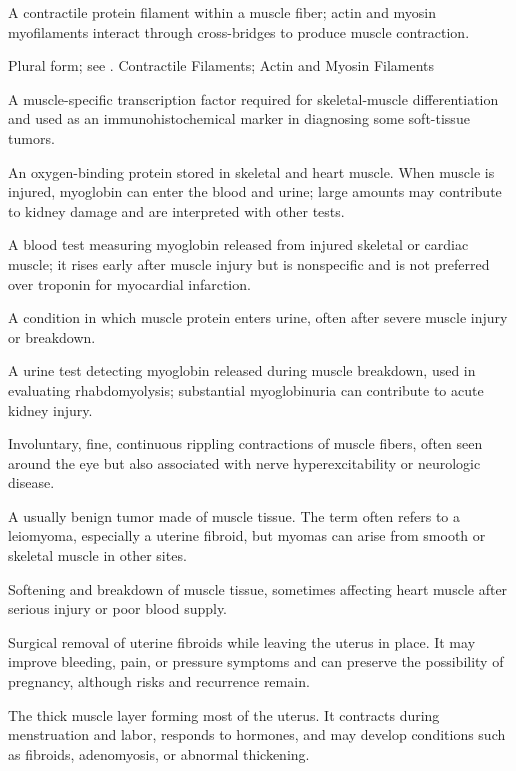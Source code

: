  A contractile protein filament within a muscle fiber; actin and myosin myofilaments interact through cross-bridges to produce muscle contraction.

 Plural form; see .
\synonyms
Contractile Filaments; Actin and Myosin Filaments

 A muscle-specific transcription factor required for skeletal-muscle differentiation and used as an immunohistochemical marker in diagnosing some soft-tissue tumors.

 An oxygen-binding protein stored in skeletal and heart muscle. When muscle is injured, myoglobin can enter the blood and urine; large amounts may contribute to kidney damage and are interpreted with other tests.

 A blood test measuring myoglobin released from injured skeletal or cardiac muscle; it rises early after muscle injury but is nonspecific and is not preferred over troponin for myocardial infarction.

 A condition in which muscle protein enters urine, often after severe muscle injury or breakdown.

 A urine test detecting myoglobin released during muscle breakdown, used in evaluating rhabdomyolysis; substantial myoglobinuria can contribute to acute kidney injury.

 Involuntary, fine, continuous rippling contractions of muscle fibers, often seen around the eye but also associated with nerve hyperexcitability or neurologic disease.

 A usually benign tumor made of muscle tissue. The term often refers to a leiomyoma, especially a uterine fibroid, but myomas can arise from smooth or skeletal muscle in other sites.

 Softening and breakdown of muscle tissue, sometimes affecting heart muscle after serious injury or poor blood supply.


 Surgical removal of uterine fibroids while leaving the uterus in place. It may improve bleeding, pain, or pressure symptoms and can preserve the possibility of pregnancy, although risks and recurrence remain.

 The thick muscle layer forming most of the uterus. It contracts during menstruation and labor, responds to hormones, and may develop conditions such as fibroids, adenomyosis, or abnormal thickening.

